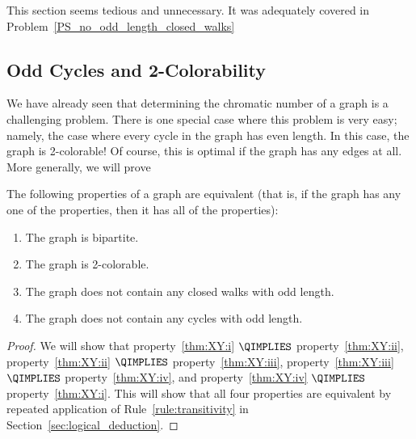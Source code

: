 \begin{editingnotes}
\begin{staffnotes}This section seems tedious and unnecessary.
It was adequately covered in Problem~\ref{PS_no_odd_length_closed_walks}

\end{staffnotes}

\subsection*{Odd Cycles and 2-Colorability}

We have already seen that determining the chromatic number of a graph
is a challenging problem.  There is one special case where this
problem is very easy; namely, the case where every cycle in the graph
has even length.  In this case, the graph is 2-colorable!  Of course,
this is optimal if the graph has any edges at all.  More generally, we
will prove

\begin{theorem}\label{thm:XY}
The following properties of a graph are equivalent (that is, if the
graph has any one of the properties, then it has all of the
properties):
\begin{enumerate}

\item\label{thm:XY:i}
The graph is bipartite.

\item\label{thm:XY:ii}
The graph is 2-colorable.

\item\label{thm:XY:iii}
The graph does not contain any closed walks with odd length.

\item\label{thm:XY:iv}
The graph does not contain any cycles with odd length.

\end{enumerate}
\end{theorem}

\begin{proof}

We will show that
property~\ref{thm:XY:i} $\QIMPLIES$ property~\ref{thm:XY:ii}, 
property~\ref{thm:XY:ii} $\QIMPLIES$ property~\ref{thm:XY:iii}, 
property~\ref{thm:XY:iii} $\QIMPLIES$ property~\ref{thm:XY:iv}, and
property~\ref{thm:XY:iv} $\QIMPLIES$ property~\ref{thm:XY:i}.  This
will show that all four properties are equivalent by repeated
application of Rule~\ref{rule:transitivity} in
Section~\ref{sec:logical_deduction}.


\end{proof}
\end{editingnotes}
